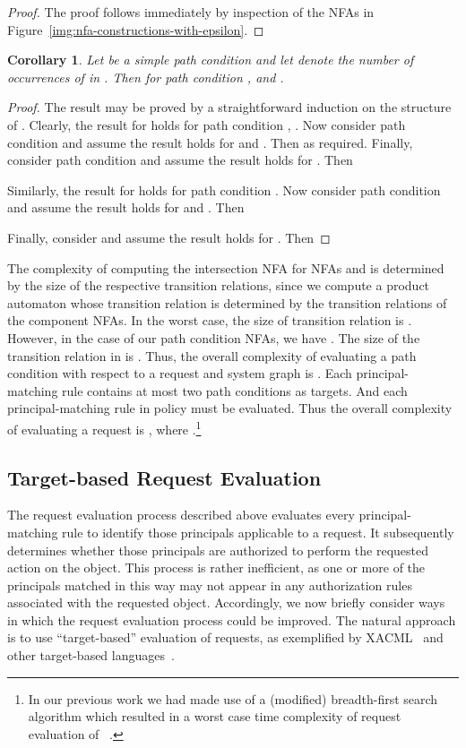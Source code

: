 \documentclass{article}
\newtheorem{corollary}{Corollary}
\begin{document}
\begin{proof}
 The proof follows immediately by inspection of the NFAs in Figure~\ref{img:nfa-constructions-with-epsilon}.
\end{proof}

\begin{corollary}
 Let  be a simple path condition and let  denote the number of occurrences of  in .
 Then for path condition ,  and .
\end{corollary}

\begin{proof}
 The result may be proved by a straightforward induction on the structure of .
 Clearly, the result for  holds for path condition , .
 Now consider path condition  and assume the result holds for  and .
 Then  as required.
 Finally, consider path condition  and assume the result holds for .
 Then 

 Similarly, the result for  holds for path condition .
 Now consider path condition  and assume the result holds for  and .
 Then
 
 Finally, consider  and assume the result holds for .
 Then 
\end{proof}

The complexity of computing the intersection NFA for NFAs  and  is determined by the size of the respective transition relations, since we compute a product automaton whose transition relation is determined by the transition relations of the component NFAs.
In the worst case, the size of transition relation  is .
However, in the case of our path condition NFAs, we have .
The size of the transition relation in  is .
Thus, the overall complexity of evaluating a path condition  with respect to a request and system graph  is .
Each principal-matching rule contains at most two path conditions as targets.
And each principal-matching rule in policy  must be evaluated.
Thus the overall complexity of evaluating a request is , where .\footnote{In our previous work we had made use of a (modified) breadth-first search algorithm which resulted in a worst case time complexity of request evaluation of \mbox{}~\cite{CramptonS14}.}

\subsection{Target-based Request Evaluation}\label{sec:requests:target-based}

The request evaluation process described above evaluates every principal-matching rule to identify those principals applicable to a request.
It subsequently determines whether those principals are authorized to perform the requested action on the object.
This process is rather inefficient, as one or more of the principals matched in this way may not appear in any authorization rules associated with the requested object.
Accordingly, we now briefly consider ways in which the request evaluation process could be improved.
The natural approach is to use ``target-based'' evaluation of requests, as exemplified by XACML~\cite{XACML3} and other target-based languages~\cite{BrunsH11,CramptonM12}.
\end{document}
